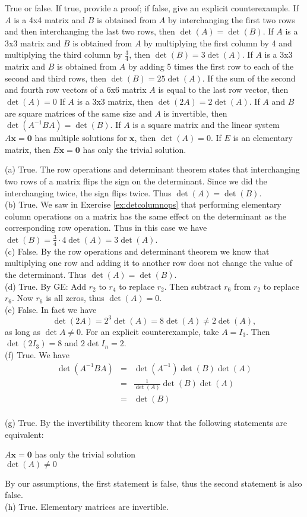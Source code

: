 \ii True or false. If true, provide a proof; if false, give an explicit counterexample. 
\bb
\ii If $A$ is a 4x4 matrix and $B$ is obtained from $A$ by interchanging the first two rows and then interchanging the last two rows, then $\det(A)=\det(B)$.
\ii If $A$ is a 3x3 matrix and $B$ is obtained from $A$ by multiplying the first column by 4 and multiplying the third column by $\frac{3}{4}$, then $\det(B)=3\det(A)$.
\ii If $A$ is a 3x3 matrix and $B$ is obtained from $A$ by adding 5 times the first row to each of the second and third rows, then $\det(B) = 25\det(A)$.
\ii If the sum of the second and fourth row vectors of a 6x6 matrix $A$ is equal to the last row vector, then $\det(A) = 0$
\ii If $A$ is a 3x3 matrix, then $\det(2A) = 2\det(A)$.
\ii If $A$ and $B$ are square matrices of the same size and $A$ is invertible, then $\det(A^{-1}BA)=\det(B)$.
\ii If $A$ is a square matrix and the linear system $A\textbf{x} = \textbf{0}$ has multiple solutions for $\textbf{x}$, then $\det(A)=0$.
\ii If $E$ is an elementary matrix, then $E\textbf{x} = \textbf{0}$ has only the trivial solution.
\ee
\begin{solution}
\noindent (a) True. 
The row operations and determinant theorem states that interchanging two rows of a matrix flips the sign on the determinant. Since we did the interchanging twice, the sign flips twice. Thus $\det(A)=\det(B)$.
\\
(b) True. 
We saw in Exercise \ref{ex:detcolumnops} that performing elementary column operations on a matrix has the same effect on the determinant as the corresponding row operation. Thus in this case we have $\det(B) =\frac{3}{4}\cdot 4 \det(A) = 3\det(A)$.
\\
(c) False. 
By the row operations and determinant theorem we know that multiplying one row and adding it to another row does not change the value of the determinant. Thus $\det(A)=\det(B)$.
\\
(d) True.
By GE: Add $r_2$ to $r_4$ to replace $r_2$. Then subtract $r_6$ from $r_2$ to replace $r_6$. Now $r_6$ is all zeros, thus $\det(A) = 0$.
\\
(e) False. In fact we have 
$$\det(2A) = 2^3\det(A) = 8\det(A) \neq 2\det(A),$$ 
as long as $\det A\ne 0$. For an explicit counterexample, take $A=I_3$. Then $\det(2I_3)=8$ and $2\det I_n=2$. 
\\
(f) True. We have 
\begin{eqnarray*}
\det(A^{-1}BA)&=&\det(A^{-1})\det(B)\det(A)\\
&=&\frac{1}{\det(A)}\det(B)\det(A)\\
&=&\det(B)
\end{eqnarray*}
\\
(g) True.
By the invertibility theorem  know that the following statements are equivalent:
\begin{center}
$A\textbf{x} = \textbf{0}$ has only the trivial solution\\
$\det(A)\neq 0$
\end{center}
By our assumptions, the first statement is false, thus the second statement is also false.
\\
(h) True. Elementary matrices are invertible. 

\end{solution}




\ee